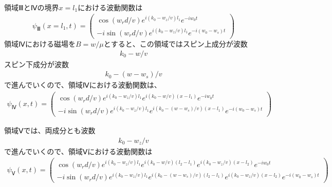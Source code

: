 $領域ⅢとⅣの境界x=l_{1}における波動関数は$
\begin{align}
{\psi}_{Ⅲ}(x=l_{1},t)=
\begin{pmatrix}
\cos(w_{r}d/v)e^{i(k_{0}-w_{z}/v)l_{1}}e^{-iw_{0}t} \\
-i\sin(w_{r}d/v)e^{i(k_{0}-w_{z}/v)l_{1}}e^{-i(w_{0}-w_{s})t}
\end{pmatrix}
\end{align}
$領域Ⅳにおける磁場をB={w}/{\mu}とすると、この領域ではスピン上成分が波数$
\begin{align}
k_{0}-w/v
\end{align}
スピン下成分が波数
\begin{align}
k_{0}-(w-w_{s})/v
\end{align}
で進んでいくので、領域Ⅳにおける波動関数は、
\begin{align}
{\psi}_{Ⅳ}(x,t)=
\begin{pmatrix}
\cos(w_{r}d/v)e^{i(k_{0}-w_{z}/v)l_{1}}e^{i(k_{0}-w/v)(x-l_{1})}e^{-iw_{0}t} \\
-i\sin(w_{r}d/v)e^{i(k_{0}-w_{z}/v)l_{1}}e^{i(k_{0}-(w-w_{s})/v)(x-l_{1})}e^{-i(w_{0}-w_{s})t}
\end{pmatrix}
\end{align}

領域Ⅴでは、両成分とも波数
\begin{align}
k_{0}-w_{z}/v
\end{align}
で進んでいくので、領域Ⅴにおける波動関数は
\begin{align}
{\psi}_{Ⅴ}(x,t)=
\begin{pmatrix}
\cos(w_{r}d/v)e^{i(k_{0}-w_{z}/v)l_{1}}e^{i(k_{0}-w/v)(l_{2}-l_{1})}e^{i(k_{0}-w_{z}/v)(x-l_{2})}e^{-iw_{0}t} \\
-i\sin(w_{r}d/v)e^{i(k_{0}-w_{z}/v)l_{1}}e^{i(k_{0}-(w-w_{s})/v)(l_{2}-l_{1})}e^{i(k_{0}-w_{z}/v)(x-l_{2})}e^{-i(w_{0}-w_{s})t}
\end{pmatrix}
\end{align}

